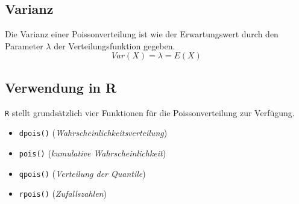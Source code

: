 \subsection{Varianz}
Die Varianz einer Poissonverteilung ist wie der Erwartungswert durch den 
Parameter $\lambda$ der Verteilungsfunktion gegeben.
\[  
	Var(X) = \lambda = E(X)
\]

\subsection{Verwendung in R}
\lstinline{R} stellt grundsätzlich vier Funktionen für die 
Poissonverteilung zur Verfügung. 
\begin{itemize}
	\item \lstinline{dpois()} \hfill{} 
		(\emph{Wahrscheinlichkeitsverteilung})
	\item \lstinline{pois()} \hfill{}
		(\emph{kumulative Wahrscheinlichkeit})
	\item \lstinline{qpois()} \hfill{}
		(\emph{Verteilung der Quantile})
	\item \lstinline{rpois()} \hfill{}
		(\emph{Zufallszahlen})
\end{itemize}





